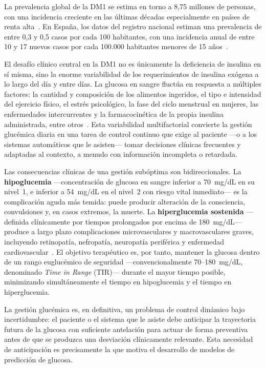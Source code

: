 La prevalencia global de la DM1 se estima en torno a 8,75 millones de personas, con una incidencia creciente en las últimas décadas especialmente en países de renta alta~\cite{divers2020prevalence}. En España, los datos del registro nacional estiman una prevalencia de entre 0,3 y 0,5 casos por cada 100 habitantes, con una incidencia anual de entre 10 y 17 nuevos casos por cada 100.000 habitantes menores de 15 años~\cite{sediabetes2023}.

El desafío clínico central en la DM1 no es únicamente la deficiencia de insulina en sí misma, sino la enorme variabilidad de los requerimientos de insulina exógena a lo largo del día y entre días. La glucosa en sangre fluctúa en respuesta a múltiples factores: la cantidad y composición de los alimentos ingeridos, el tipo e intensidad del ejercicio físico, el estrés psicológico, la fase del ciclo menstrual en mujeres, las enfermedades intercurrentes y la farmacocinética de la propia insulina administrada, entre otros~\cite{kovatchev2019metrics}. Esta variabilidad multifactorial convierte la gestión glucémica diaria en una tarea de control continuo que exige al paciente —o a los sistemas automáticos que le asisten— tomar decisiones clínicas frecuentes y adaptadas al contexto, a menudo con información incompleta o retardada.

Las consecuencias clínicas de una gestión subóptima son bidireccionales. La \textbf{hipoglucemia} —concentración de glucosa en sangre inferior a 70~mg/dL en su nivel~1, e inferior a 54~mg/dL en el nivel~2 con riesgo vital inmediato— es la complicación aguda más temida: puede producir alteración de la consciencia, convulsiones y, en casos extremos, la muerte. La \textbf{hiperglucemia sostenida} —definida clínicamente por tiempos prolongados por encima de 180~mg/dL— produce a largo plazo complicaciones microvasculares y macrovasculares graves, incluyendo retinopatía, nefropatía, neuropatía periférica y enfermedad cardiovascular~\cite{brownlee2005pathobiology}. El objetivo terapéutico es, por tanto, mantener la glucosa dentro de un rango euglucémico de seguridad —convencionalmente 70--180~mg/dL, denominado \emph{Time in Range} (TIR)— durante el mayor tiempo posible, minimizando simultáneamente el tiempo en hipoglucemia y el tiempo en hiperglucemia.

La gestión glucémica es, en definitiva, un problema de control dinámico bajo incertidumbre: el paciente o el sistema que le asiste debe anticipar la trayectoria futura de la glucosa con suficiente antelación para actuar de forma preventiva antes de que se produzca una desviación clínicamente relevante. Esta necesidad de anticipación es precisamente la que motiva el desarrollo de modelos de predicción de glucosa.

